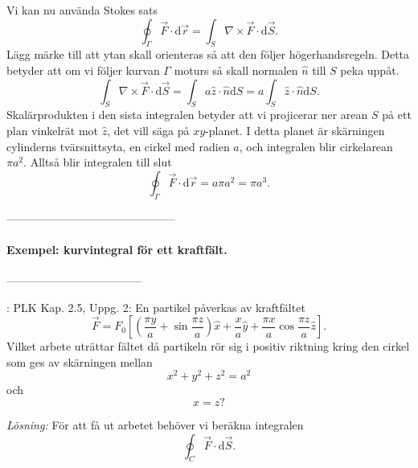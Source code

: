 \documentclass[%
oneside,                 %
final,                   %
10pt]{article}
\newcommand{\shortinlinecomment}[3]{{\color{red}{\bf #1}: #2}}
\begin{document}
Vi kan nu använda Stokes sats
\begin{equation}
  \oint_\Gamma \vec{F} \cdot \mbox{d}\vec{r} = \int_S \nabla \times \vec{F} \cdot
\mbox{d}\vec{S}.
\end{equation}
Lägg märke till att ytan skall orienteras så att den följer högerhandsregeln.  Detta betyder att om vi följer kurvan $\Gamma$ moturs så skall normalen $\hat{n}$ till $S$ peka uppåt.  
\begin{equation}
  \int_S \nabla \times \vec{F} \cdot \mbox{d}\vec{S} = \int_S a \hat{z} \cdot 
\hat{n} \mbox{d}S = a \int_S \hat{z} \cdot \hat{n} \mbox{d}S.
\end{equation}
Skalärprodukten i den sista integralen betyder att vi projicerar ner arean $S$ på ett plan vinkelrät mot $\hat{z}$, det vill säga på $xy$-planet.  I detta planet är skärningen cylinderns tvärsnittsyta, en cirkel med radien $a$, och integralen blir cirkelarean $\pi a^2$. Alltså blir integralen till slut
\begin{equation}
  \oint_\Gamma \vec{F} \cdot \mbox{d}\vec{r} = a \pi a^2 = \pi a^3.
\end{equation}

---------------------------------------------

\paragraph{Exempel: kurvintegral för ett kraftfält.}
------------------------------------

\shortinlinecomment{Comment 3}{ PLK Kap. 2.5, Uppg. 2: }{ PLK Kap. 2.5, Uppg. }  En partikel påverkas av kraftfältet
\begin{equation}
  \vec{F} = F_0 \left[\left(\frac{\pi y}{a} + \sin \frac{\pi z}{a}\right)
\hat{x} + \frac{x}{a} \hat{y} + \frac{\pi x}{a} \cos \frac{\pi z}{a}
\hat{z}\right].
\end{equation}
Vilket arbete uträttar fältet då partikeln rör sig i positiv riktning kring den cirkel som ges av skärningen mellan
\begin{equation}
  x^2 + y^2 + z^2 = a^2
\end{equation}
och
\begin{equation}
  x = z?
\end{equation}

\emph{Lösning:}  
För att få ut arbetet behöver vi beräkna integralen
\begin{equation}
  \oint_C \vec{F} \cdot \mbox{d}\vec{S}.
\end{equation}
\end{document}

